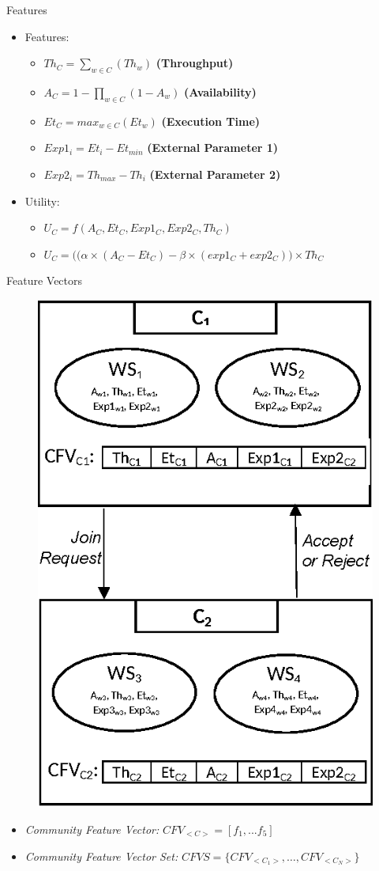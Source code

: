\documentclass{beamer}
\begin{document}
\begin{frame}{Features}
    \begin{itemize}
        \item Features:
        \begin{itemize}
            \item $Th_{C} = \sum_{w \in C}{(Th_{w})}$ \textbf{(Throughput)}
            \item $A_{C} = 1-\prod_{w \in C}{(1-A_{w})}$ \textbf{(Availability)}
            \item $Et_{C} = max_{w \in C}{(Et_{w})}$ \textbf{(Execution Time)}
            \item $Exp1_i = Et_{i} - Et_{min}$ \textbf{(External Parameter 1)}
            \item $Exp2_i = Th_{max} - Th_{i}$ \textbf{(External Parameter 2)}
        \end{itemize}
        \item Utility:
        \begin{itemize}
            \item $U_{C} = f(A_{C}, Et_{C}, Exp1_{C}, Exp2_{C}, Th_{C})$
            \item $U_{C} = \big((\alpha \times (A_{C} - Et_{C}) - \beta \times (exp1_{C} + exp2_{C})\big) \times Th_{C}$
        \end{itemize}
    \end{itemize}
\end{frame}

\begin{frame}{Feature Vectors}

    \begin{figure}[htbp]
        \centering
        \includegraphics[width=0.35 \columnwidth]{figures/cfvs.eps}
    \end{figure}

    \footnotesize
    \begin{itemize}
        \item \emph{Community Feature Vector:} $CFV_{<C>} = [f_1,...f_5]$
        \item \emph{Community Feature Vector Set:} $CFVS = \{CFV_{<C_1>}, \dots, CFV_{<C_N>}\}$
    \end{itemize}
\end{frame}
\end{document}

